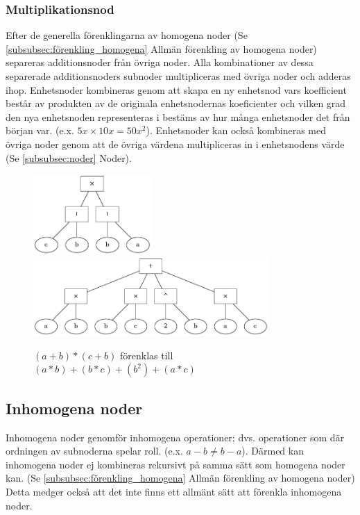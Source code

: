 \documentclass[12pt,a4paper]{article}
\begin{document}
\subsubsection{Multiplikationsnod}
Efter de generella förenklingarna av homogena noder (Se \ref{subsubsec:förenkling_homogena} Allmän förenkling av homogena noder) separeras additionsnoder från övriga noder. Alla kombinationer av dessa separerade additionsnoders subnoder multipliceras med övriga noder och adderas ihop. Enhetsnoder kombineras genom att skapa en ny enhetsnod vars koefficient består av produkten av de originala enhetsnodernas koeficienter och vilken grad den nya enhetsnoden representeras i bestäms av hur många enhetsnoder det från början var. (e.x. \(5x \times 10x = 50x^{2}\)). Enhetsnoder kan också kombineras med övriga noder genom att de övriga värdena multipliceras in i enhetsnodens värde (Se \ref{subsubsec:noder} Noder).
\begin{figure}[h!]
  \centering
  \includegraphics[width=0.4\textwidth]{image26}
  \includegraphics[width=0.8\textwidth]{image32}
  \caption{\((a + b) * (c + b)\) förenklas till \((a * b) + (b * c) + (b ^ 2) + (a * c)\)}
\end{figure}
\subsection{Inhomogena noder}
\label{subsec:inhomogena_noder}
Inhomogena noder genomför inhomogena operationer; dvs. operationer som där ordningen av subnoderna spelar roll. (e.x. \(a - b \neq b - a\)). Därmed kan inhomogena noder ej kombineras rekursivt på samma sätt som homogena noder kan. (Se \ref{subsubsec:förenkling_homogena} Allmän förenkling av homogena noder) Detta medger också att det inte finns ett allmänt sätt att förenkla inhomogena noder.
\end{document}

